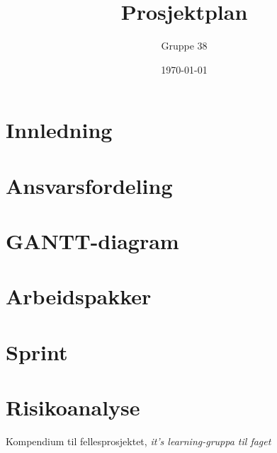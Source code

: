 \documentclass[titlepage]{article}
\author{Gruppe 38}
\title{Prosjektplan}
\date{\today}
\begin{document}
\maketitle

\begin{abstract}

\end{abstract}

\tableofcontents


\newpage
\section{Innledning}


\newpage
\section{Ansvarsfordeling}


\newpage
\section{GANTT-diagram}


\newpage
\section{Arbeidspakker}


\newpage
\section{Sprint}


\newpage
\section{Risikoanalyse}


\newpage
\listoftables

\newpage
\listoffigures

\newpage
\begin{thebibliography}{9}

	Kompendium til fellesprosjektet,
	\emph{it's learning-gruppa til faget}
\end{thebibliography}
\end{document}
